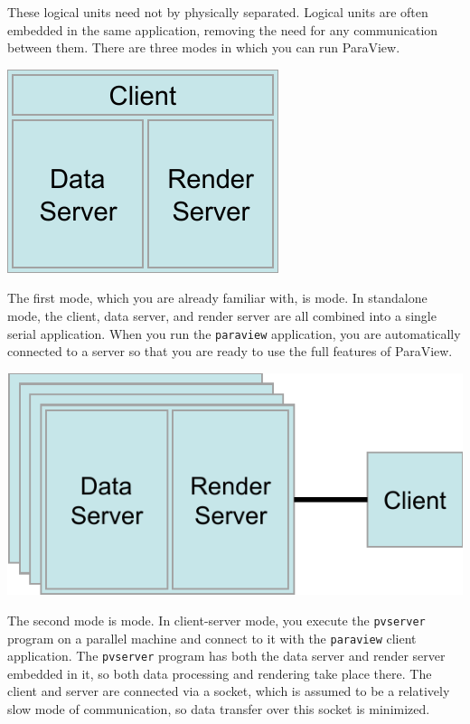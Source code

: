 These logical units need not by physically separated.  Logical units are
often embedded in the same application, removing the need for any
communication between them.  There are three modes in which you can run
ParaView.

\begin{inlinefig}
  \includegraphics{images/RunModeStandalone}
\end{inlinefig}

The first mode, which you are already familiar with, is
 mode.  In standalone mode, the client, data server,
and render server are all combined into a single serial application.  When
you run the \texttt{paraview} application, you are automatically connected
to a  server so that you are ready to use the full
features of ParaView.

\begin{inlinefig}
  \includegraphics{images/RunModeClientServer}
\end{inlinefig}

The second mode is  mode.  In client-server mode,
you execute the \texttt{pvserver} program on a parallel machine and connect
to it with the \texttt{paraview} client application.  The \texttt{pvserver}
program has both the data server and render server embedded in it, so both
data processing and rendering take place there.  The client and server are
connected via a socket, which is assumed to be a relatively slow mode of
communication, so data transfer over this socket is minimized.

